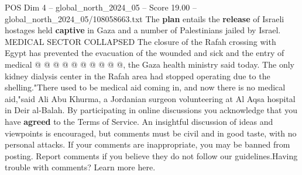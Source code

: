 \begin{textsample}{POS Dim 4 – global\_north\_2024\_05 – Score 19.00 – global\_north\_2024\_05/108058663.txt}
The \textbf{plan} entails the \textbf{release} of Israeli hostages held \textbf{captive} in Gaza and a number of Palestinians jailed by Israel.
MEDICAL SECTOR COLLAPSED The closure of the Rafah crossing with Egypt has prevented the evacuation of the wounded and sick and the entry of medical @ @ @ @ @ @ @ @ @ @, the Gaza health ministry said today.
The only kidney dialysis center in the Rafah area had stopped operating due to the shelling."There used to be medical aid coming in, and now there is no medical aid,"said Ali Abu Khurma, a Jordanian surgeon volunteering at Al Aqsa hospital in Deir al-Balah.
By participating in online discussions you acknowledge that you have \textbf{agreed} to the Terms of Service.
An insightful discussion of ideas and viewpoints is encouraged, but comments must be civil and in good taste, with no personal attacks.
If your comments are inappropriate, you may be banned from posting.
Report comments if you believe they do not follow our guidelines.Having trouble with comments?
Learn more here.

\end{textsample}
